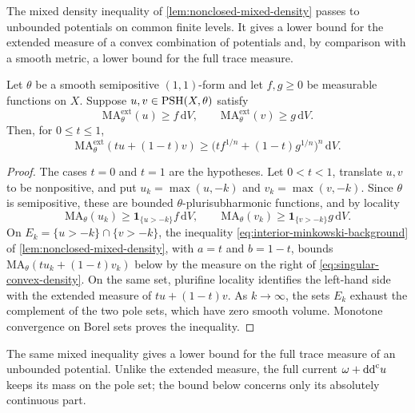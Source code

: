 The mixed density inequality of \cref{lem:nonclosed-mixed-density} passes to unbounded potentials on common finite levels. It gives a lower bound for the extended measure of a convex combination of potentials and, by comparison with a smooth metric, a lower bound for the full trace measure.

\begin{lemma}\label{lem:singular-convex-density}
Let $\theta$ be a smooth semipositive $(1,1)$-form and let $f,g\geq0$ be measurable functions on $X$. Suppose $u,v\in\mathrm{PSH}(X,\theta)$ satisfy
\[
 \mathrm{MA}^{\mathrm{ext}}_\theta(u)\geq f\,\mathrm{d}V,
 \qquad \mathrm{MA}^{\mathrm{ext}}_\theta(v)\geq g\,\mathrm{d}V.
\]
Then, for $0\leq t\leq1$,
\begin{equation}\label{eq:singular-convex-density}
 \mathrm{MA}^{\mathrm{ext}}_\theta(tu+(1-t)v)
 \geq\bigl(tf^{1/n}+(1-t)g^{1/n}\bigr)^n\,\mathrm{d}V.
\end{equation}
\end{lemma}
\begin{proof}
The cases $t=0$ and $t=1$ are the hypotheses. Let $0<t<1$, translate $u,v$ to be nonpositive, and put $u_k=\max(u,-k)$ and $v_k=\max(v,-k)$. Since $\theta$ is semipositive, these are bounded $\theta$-plurisubharmonic functions, and by locality
\[
 \mathrm{MA}_\theta(u_k)\geq\mathbf1_{\{u>-k\}}f\,\mathrm{d}V,
 \qquad
 \mathrm{MA}_\theta(v_k)\geq\mathbf1_{\{v>-k\}}g\,\mathrm{d}V.
\]
On $E_k=\{u>-k\}\cap\{v>-k\}$, the inequality \eqref{eq:interior-minkowski-background} of \cref{lem:nonclosed-mixed-density}, with $a=t$ and $b=1-t$, bounds $\mathrm{MA}_\theta(tu_k+(1-t)v_k)$ below by the measure on the right of \eqref{eq:singular-convex-density}. On the same set, plurifine locality identifies the left-hand side with the extended measure of $tu+(1-t)v$. As $k\to\infty$, the sets $E_k$ exhaust the complement of the two pole sets, which have zero smooth volume. Monotone convergence on Borel sets proves the inequality.
\end{proof}

The same mixed inequality gives a lower bound for the full trace measure of an unbounded potential. Unlike the extended measure, the full current $\omega+\mathrm{dd}^{\mathrm{c}} u$ keeps its mass on the pole set; the bound below concerns only its absolutely continuous part.

